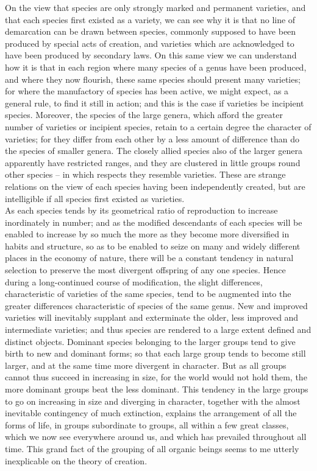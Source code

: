 \indent On the view that species are only strongly marked and permanent varieties, and that each species first existed as a variety, we can see why it is that no line of demarcation can be drawn between species, commonly supposed to have been produced by special acts of creation, and varieties which are acknowledged to have been produced by secondary laws. On this same view we can understand how it is that in each region where many species of a genus have been produced, and where they now flourish, these same species should present many varieties; for where the manufactory of species has been active, we might expect, as a general rule, to find it still in action; and this is the case if varieties be incipient species. Moreover, the species of the large genera, which afford the greater number of varieties or incipient species, retain to a certain degree the character of varieties; for they differ from each other by a less amount of difference than do the species of smaller genera. The closely allied species also of the larger genera apparently have restricted ranges, and they are clustered in little groups round other species -- in which respects they resemble varieties. These are strange relations on the view of each species having been independently created, but are intelligible if all species first existed as varieties.~\\
\indent As each species tends by its geometrical ratio of reproduction to increase inordinately in number; and as the modified descendants of each species will be enabled to increase by so much the more as they become more diversified in habits and structure, so as to be enabled to seize on many and widely different places in the economy of nature, there will be a constant tendency in natural selection to preserve the most divergent offspring of any one species.  Hence during a long-continued course of modification, the slight differences, characteristic of varieties of the same species, tend to be augmented into the greater differences characteristic of species of the same genus. New and improved varieties will inevitably supplant and exterminate the older, less improved and intermediate varieties; and thus species are rendered to a large extent defined and distinct objects. Dominant species belonging to the larger groups tend to give birth to new and dominant forms; so that each large group tends to become still larger, and at the same time more divergent in character. But as all groups cannot thus succeed in increasing in size, for the world would not hold them, the more dominant groups beat the less dominant. This tendency in the large groups to go on increasing in size and diverging in character, together with the almost inevitable contingency of much extinction, explains the arrangement of all the forms of life, in groups subordinate to groups, all within a few great classes, which we now see everywhere around us, and which has prevailed throughout all time. This grand fact of the grouping of all organic beings seems to me utterly inexplicable on the theory of creation.~\\
